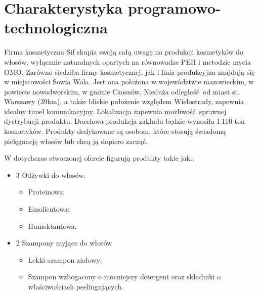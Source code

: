 \section{Charakterystyka programowo-technologiczna}

Firma kosmetyczna \textsf{Sif} skupia swoją całą uwagę na produkcji kosmetyków do włosów, wyłącznie naturalnych opartych na równowadze PEH i metodzie mycia OMO. Zarówno siedziba firmy kosmetycznej, jak i linia produkcyjna znajdują się w miejscowości Sowia Wola. Jest ona położona w województwie mazowieckim, w powiecie nowodworskim, w gminie Czosnów. Nieduża odległość od miast st. Warszawy (39km), a także bliskie położenie względem Wisłostrady, zapewnia idealny tunel komunikacyjny. Lokalizacja zapewnia możliwość sprawnej dystrybucji produktu. Docelowa produkcja zakładu będzie wynosiła 1\,110 ton kosmetyków.
Produkty dedykowane są osobom, które stosują świadomą pielęgnację włosów lub chcą ją dopiero zacząć. \vspace{\baselineskip}

W dotychczas stworzonej ofercie figurują produkty takie jak.:

\begin{itemize}
	\item 3 Odżywki do włosów:
	\begin{itemize}
	\item Proteinowa;
	\item Emolientowa;
	\item Humektantowa.
	\end{itemize}
	\item 2 Szampony myjące do włosów
	\begin{itemize}
	\item Lekki szampon ziołowy;
	\item Szampon wzbogacony o mocniejszy detergent oraz składniki o właściwościach peelingujących.
	\end{itemize}
\end{itemize}\vspace{\baselineskip}

